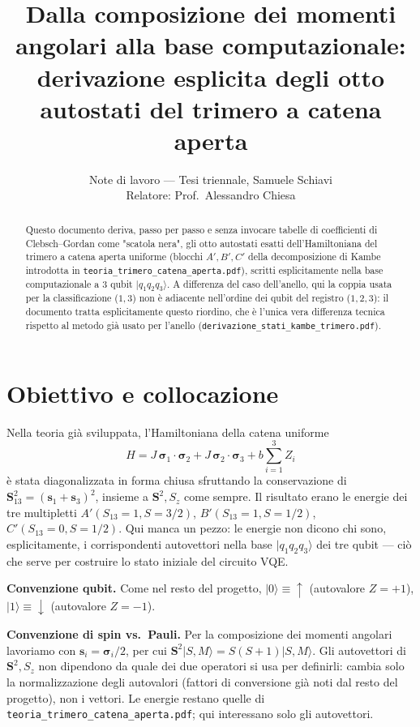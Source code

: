 \documentclass[11pt,a4paper]{article}
\title{Dalla composizione dei momenti angolari alla base computazionale:\\
derivazione esplicita degli otto autostati del trimero a catena aperta}
\author{Note di lavoro — Tesi triennale, Samuele Schiavi\\ Relatore: Prof.\ Alessandro Chiesa}
\date{}
\begin{document}
\maketitle

\begin{abstract}
\noindent
Questo documento deriva, passo per passo e senza invocare tabelle di
coefficienti di Clebsch–Gordan come "scatola nera", gli otto autostati
esatti dell'Hamiltoniana del trimero a catena aperta uniforme (blocchi
$A',B',C'$ della decomposizione di Kambe introdotta in
\texttt{teoria\_\allowbreak trimero\_\allowbreak catena\_\allowbreak aperta.pdf}), scritti esplicitamente nella
base computazionale a 3 qubit $|q_1q_2q_3\rangle$. A differenza del caso
dell'anello, qui la coppia usata per la classificazione ($1,3$) non è
adiacente nell'ordine dei qubit del registro ($1,2,3$): il documento tratta
esplicitamente questo riordino, che è l'unica vera differenza tecnica
rispetto al metodo già usato per l'anello
(\texttt{derivazione\_\allowbreak stati\_\allowbreak kambe\_\allowbreak trimero.pdf}).
\end{abstract}

\section{Obiettivo e collocazione}

Nella teoria già sviluppata, l'Hamiltoniana della catena uniforme
\begin{equation}
H = J\,\boldsymbol\sigma_1\cdot\boldsymbol\sigma_2 + J\,\boldsymbol\sigma_2\cdot\boldsymbol\sigma_3 + b\sum_{i=1}^{3}Z_i
\end{equation}
è stata diagonalizzata in forma chiusa sfruttando la conservazione di
$\mathbf S_{13}^2=(\mathbf s_1+\mathbf s_3)^2$, insieme a $\mathbf S^2,S_z$
come sempre. Il risultato erano le energie dei tre multipletti $A'(S_{13}=1,S=3/2)$,
$B'(S_{13}=1,S=1/2)$, $C'(S_{13}=0,S=1/2)$. Qui manca un pezzo: le energie
non dicono chi sono, esplicitamente, i corrispondenti autovettori nella base
$|q_1q_2q_3\rangle$ dei tre qubit — ciò che serve per costruire lo stato
iniziale del circuito VQE.

\textbf{Convenzione qubit.} Come nel resto del progetto, $|0\rangle\equiv{\uparrow}$
(autovalore $Z=+1$), $|1\rangle\equiv{\downarrow}$ (autovalore $Z=-1$).

\textbf{Convenzione di spin vs.\ Pauli.} Per la composizione dei momenti
angolari lavoriamo con $\mathbf s_i=\boldsymbol\sigma_i/2$, per cui
$\mathbf S^2|S,M\rangle=S(S+1)|S,M\rangle$. Gli autovettori di $\mathbf
S^2,S_z$ non dipendono da quale dei due operatori si usa per definirli:
cambia solo la normalizzazione degli autovalori (fattori di conversione già
noti dal resto del progetto), non i vettori. Le energie restano quelle di
\texttt{teoria\_\allowbreak trimero\_\allowbreak catena\_\allowbreak aperta.pdf}; qui interessano solo gli
autovettori.
\end{document}
